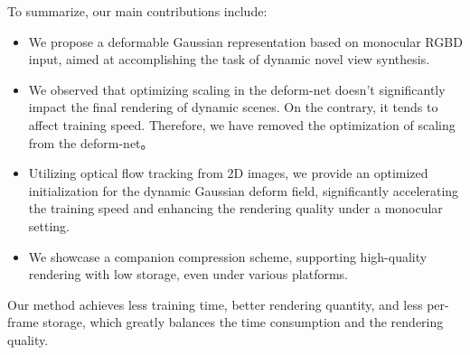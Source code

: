 To summarize, our main contributions include:
 
\begin{itemize}
    \item We propose a deformable Gaussian representation based on 
monocular RGBD input, aimed at accomplishing the task of 
dynamic novel view synthesis.
    \item We observed that optimizing scaling in the deform-net doesn't significantly impact the final rendering of dynamic scenes. On the contrary, it tends to affect training speed. Therefore, we have removed the optimization of scaling from the deform-net。
    \item Utilizing optical flow tracking from 2D images, we provide an 
optimized initialization for the dynamic Gaussian deform field, 
significantly accelerating the training speed and enhancing 
the rendering quality under a monocular setting.
    \item We showcase a companion compression scheme, 
supporting high-quality rendering with low storage, even 
under various platforms.
\end{itemize}

Our method achieves less training time, better rendering quantity, and less per-frame storage, which greatly balances the time consumption and the rendering quality.

